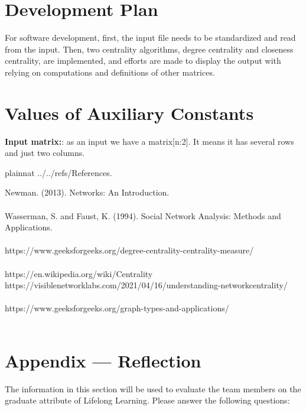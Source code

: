 \documentclass[12pt]{article}
\begin{document}
\section{Development Plan}


For software development, first, the input file needs to be standardized and read from the input. Then, two centrality algorithms, degree centrality and closeness centrality, are implemented, and efforts are made to display the output with relying on computations and definitions of other matrices.

\section{Values of Auxiliary Constants}


 \textbf{Input matrix:}: as an input we have a matrix[n:2]. It means it has several rows and just two columns.


\newpage

 {plainnat}
 {../../refs/References}.\newline

Newman. (2013). Networks: An Introduction.\\\\
Wasserman, S. and Faust, K. (1994).
Social Network Analysis: Methods and Applications.\\\\
https://www.geeksforgeeks.org/degree-centrality-centrality-measure/\\\\
https://en.wikipedia.org/wiki/Centrality\\
https://visiblenetworklabs.com/2021/04/16/understanding-networkcentrality/\\\\
https://www.geeksforgeeks.org/graph-types-and-applications/\\\\

\newpage{}
\section*{Appendix --- Reflection}

The information in this section will be used to evaluate the team members on the
graduate attribute of Lifelong Learning.  Please answer the following questions:
\end{document}

